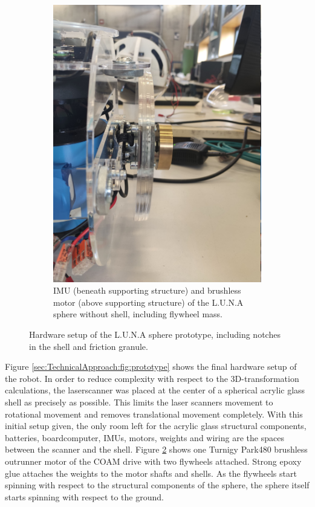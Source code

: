 \begin{figure}
\begin{subfigure}[b]{0.3\textwidth}
        \includegraphics[width=\textwidth]{../Media/sphereRightMotor.jpg}
        \caption{IMU (beneath supporting structure) and brushless motor (above supporting structure) of the L.U.N.A sphere without shell, including flywheel mass. }
        \label{sec:TechnicalApproach:fig:motor}
\end{subfigure}
\caption{Hardware setup of the L.U.N.A sphere prototype, including notches in the shell and friction granule.}
\end{figure}

Figure \ref{sec:TechnicalApproach:fig:prototype} shows the final hardware setup of the robot. In order to reduce complexity with respect to the 3D-transformation calculations, the laserscanner was placed at the center of a spherical acrylic glass shell as precisely as possible. This limits the laser scanners movement to rotational movement and removes translational movement completely. With this initial setup given, the only room left for the acrylic glass structural components, batteries, boardcomputer, IMUs, motors, weights and wiring are the spaces between the scanner and the shell. Figure \ref{sec:TechnicalApproach:fig:motor} shows one Turnigy Park480 brushless outrunner motor \cite{turnigymotor} of the COAM drive with two flywheels attached. Strong epoxy glue attaches the weights to the motor shafts and shells. As the flywheels start spinning with respect to the structural components of the sphere, the sphere itself starts spinning with respect to the ground. 

